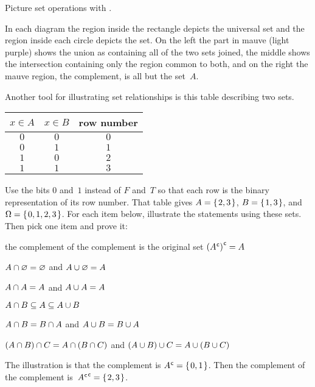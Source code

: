 \documentclass{test}  %
\begin{document}
Picture set operations with .
\begin{center}
  \hspace*{3em}
  \hspace*{3em}
\end{center}
In each diagram
the region inside the rectangle depicts the universal set and the 
region inside each circle depicts the set.
On the left the part in mauve (light purple) shows 
the union as containing all of the two sets joined, 
the middle shows the intersection
containing only the region common to both,
and on the right the mauve region, the complement, is all but the set~$A$.

\begin{ex}
Another tool for illustrating set relationships is this table describing 
two sets.
\begin{center} \small
  \begin{tabular}{cc|c}
    $x\in A$  &$x\in B$  &row number \\ \hline
    $0$       &$0$       &$0$  \\
    $0$       &$1$       &$1$  \\
    $1$       &$0$       &$2$  \\
    $1$       &$1$       &$3$  
  \end{tabular}
\end{center}
Use the bits $0$ and~$1$ instead of $F$ and~$T$ so that each
row is the binary representation of its row number.
That table gives $A=\mbox{$\{\hspace{0.1em}2,3\hspace{0.1em}\}$}$, $B=\mbox{$\{\hspace{0.1em}1,3\hspace{0.1em}\}$}$, 
and~$\Omega=\mbox{$\{\hspace{0.1em}0,1,2,3\hspace{0.1em}\}$}$.
For each item below, illustrate the statements using these sets.
Then pick one item and prove it:
\begin{items}
\item the complement of the complement is the original set
  ${({A}^{\mspace{1mu}\mathsf{c}})}^{\mspace{1mu}\mathsf{c}}=A$  
\item $A\cap\varnothing=\varnothing$ and $A\cup\varnothing=A$  
\item {} $A\cap A=A$ and $A\cup A=A$    
\item $A\cap B\subseteq A\subseteq A\cup B$  
\item {}
   $A\cap B=B\cap A$ and
   $A\cup B=B\cup A$ 
\item {} 
  $(A\cap B)\cap C=A\cap (B\cap C)$
  and
  $(A\cup B)\cup C=A\cup (B\cup C)$ 
\end{items}
\begin{ans}
\begin{items}
\item  The illustration is that the complement is 
  ${A}^{\mspace{1mu}\mathsf{c}}=\mbox{$\{\hspace{0.1em}0,1\hspace{0.1em}\}$}$.
  Then the complement of the complement is~${{A}^{\mspace{1mu}\mathsf{c}}}^{\mspace{1mu}\mathsf{c}}=\mbox{$\{\hspace{0.1em}2,3\hspace{0.1em}\}$}$.
  

\end{items}
\end{ans}
\end{ex}
\end{document}
